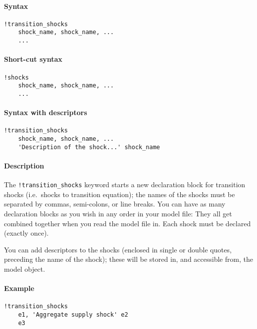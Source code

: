 


	\paragraph{Syntax}\label{syntax}

\begin{verbatim}
!transition_shocks
    shock_name, shock_name, ...
    ...
\end{verbatim}

\paragraph{Short-cut syntax}\label{short-cut-syntax}

\begin{verbatim}
!shocks
    shock_name, shock_name, ...
    ...
\end{verbatim}

\paragraph{Syntax with descriptors}\label{syntax-with-descriptors}

\begin{verbatim}
!transition_shocks
    shock_name, shock_name, ...
    'Description of the shock...' shock_name
\end{verbatim}

\paragraph{Description}\label{description}

The \texttt{!transition\_shocks} keyword starts a new declaration block
for transition shocks (i.e.~shocks to transition equation); the names of
the shocks must be separated by commas, semi-colons, or line breaks. You
can have as many declaration blocks as you wish in any order in your
model file: They all get combined together when you read the model file
in. Each shock must be declared (exactly once).

You can add descriptors to the shocks (enclosed in single or double
quotes, preceding the name of the shock); these will be stored in, and
accessible from, the model object.

\paragraph{Example}\label{example}

\begin{verbatim}
!transition_shocks
    e1, 'Aggregate supply shock' e2
    e3
\end{verbatim}



